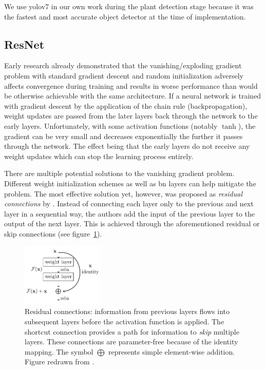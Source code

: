 \documentclass[final]{vutinfth} %
\begin{document}
We use \gls{yolo}v7 in our own work during the plant detection stage
because it was the fastest and most accurate object detector at the
time of implementation.

\subsection{ResNet}
\label{sec:methods-classification}

Early research \cite{bengio1994,glorot2010} already demonstrated that
the vanishing/exploding gradient problem with standard gradient
descent and random initialization adversely affects convergence during
training and results in worse performance than would be otherwise
achievable with the same architecture. If a neural network is trained
with gradient descent by the application of the chain rule
(backpropagation), weight updates are passed from the later layers
back through the network to the early layers. Unfortunately, with some
activation functions (notably $\tanh$), the gradient can be very small
and decreases exponentially the further it passes through the
network. The effect being that the early layers do not receive any
weight updates which can stop the learning process entirely.

There are multiple potential solutions to the vanishing gradient
problem. Different weight initialization schemes
\cite{glorot2010,sussillo2015} as well as \gls{bn} layers
\cite{ioffe2015} can help mitigate the problem. The most effective
solution yet, however, was proposed as \emph{residual connections} by
\textcite{he2016}. Instead of connecting each layer only to the
previous and next layer in a sequential way, the authors add the input
of the previous layer to the output of the next layer. This is
achieved through the aforementioned residual or skip connections (see
figure~\ref{fig:residual-connection}).

\begin{figure}
  \centering
  \includegraphics[width=0.35\textwidth]{graphics/residual-connection/res.pdf}
  \caption[Residual connection]{Residual connections: information from
    previous layers flows into subsequent layers before the activation
    function is applied. The shortcut connection provides a path for
    information to \emph{skip} multiple layers. These connections are
    parameter-free because of the identity mapping. The symbol
    $\bigoplus$ represents simple element-wise addition. Figure
    redrawn from \textcite{he2016}.}
  \label{fig:residual-connection}
\end{figure}
\end{document}
